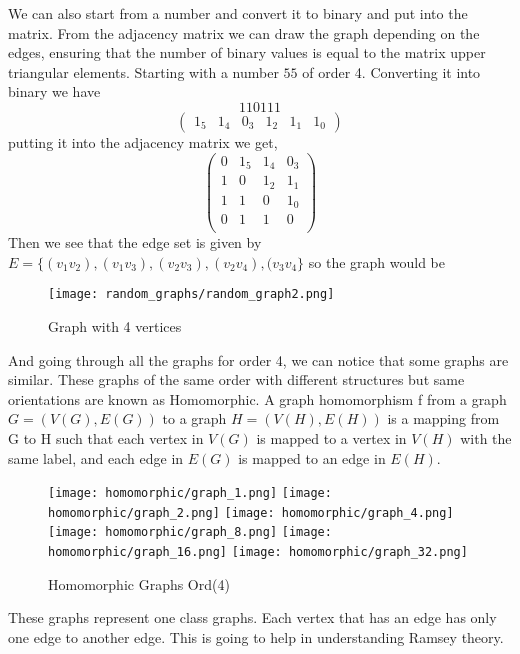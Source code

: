 \documentclass[15pt, a4paper]{Assignment}
\begin{document}
We can also start from a number and convert it to binary and put into the matrix.
From the adjacency matrix we can draw the graph depending on the edges, ensuring that the number of binary values is equal to the matrix upper triangular elements.
Starting with a number $ 55$ of order 4.
Converting it into binary we have 
$$1 1 0 111 $$
\begin{equation}
\begin{pmatrix}
	1_5&1_4&0_3&1_2&1_1&1_0
\end{pmatrix}
\end{equation}
putting it into the adjacency matrix we get,
\begin{equation}
	\begin{pmatrix}
		0& 1_5& 1_4& 0_3\\
		1 & 0 & 1_2 & 1_1\\
		1 & 1 & 0 & 1_0\\
		0 & 1 & 1 & 0\\
	\end{pmatrix}	
\end{equation}
Then we see that the edge set is given by $ E=\{(v_1v_2), (v_1v_3), (v_2v_3), (v_2v_4),(v_3v_4\}$ so the graph would be
\begin{figure}[H]
	\centering
	\texttt{[image: random\_graphs/random\_graph2.png]}
	\caption{Graph with 4 vertices}
	\label{random_graph2}
\end{figure}

And going through all the graphs for order 4, we can notice that some graphs are similar.
These graphs of the same order with different structures but same orientations are known as Homomorphic. 
A graph homomorphism f from a graph $G = (V(G),E(G))$ to a graph $H =(V(H),E(H))$
is a mapping from G to H such that each vertex in
$V(G)$ is mapped to a vertex in $V(H)$ with the same label,
and each edge in $E(G)$ is mapped to an edge in $E(H)$. \cite{fan2010graph}
\begin{figure}[H]
	\texttt{[image: homomorphic/graph\_1.png]}
	\texttt{[image: homomorphic/graph\_2.png]}
	\texttt{[image: homomorphic/graph\_4.png]}
	\texttt{[image: homomorphic/graph\_8.png]}
	\texttt{[image: homomorphic/graph\_16.png]}
	\texttt{[image: homomorphic/graph\_32.png]}
	\caption{Homomorphic Graphs Ord(4)}
	\label{Homomorphic}
\end{figure}
These graphs represent one class graphs.
Each vertex that has an edge has only one edge to another edge.
This is going to help in understanding Ramsey theory.
\end{document}

